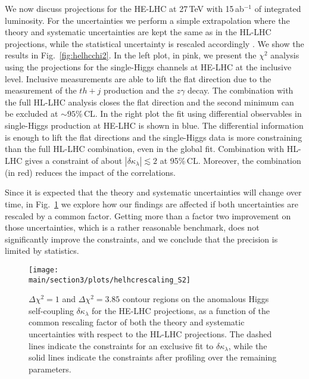 We now discuss projections for the HE-LHC at 27\,TeV with 15\,ab$^{-1}$ of integrated luminosity. For the uncertainties we perform a simple extrapolation where the theory and systematic uncertainties are kept the same as in the HL-LHC projections, while the statistical uncertainty is rescaled accordingly \cite{Goncalves:2018qas}. We show the results in Fig.~\ref{fig:helhcchi2}. In the left plot, in pink, we present the $\chi^2$ analysis using the projections for the single-Higgs channels at HE-LHC at the inclusive level. Inclusive measurements are able to lift the flat direction due to the measurement of the $th+j$ production and the $z\gamma$ decay. The combination with the full HL-LHC analysis closes the flat direction and the second minimum can be excluded at $\sim 95\%$\,CL. In the right plot the fit using differential observables in single-Higgs production at HE-LHC is shown in blue. The differential information is enough to lift the flat directions and the single-Higgs data is more constraining than the full HL-LHC combination, even in the global fit. Combination with HL-LHC gives a constraint of about $|\delta \kappa_\lambda |\lesssim  2$ at 95\%\,CL. Moreover, the combination (in red) reduces the impact of the correlations.
\medskip

Since it is expected that the theory and systematic uncertainties will change over time, in Fig.~\ref{fig:helhcrescaling} we explore how our findings are affected if both uncertainties are rescaled by a common factor. Getting more than a factor two improvement on those uncertainties, which is a rather reasonable benchmark, does not significantly improve the constraints, and we conclude that the precision is limited by statistics.	

\begin{figure}[h]
	\centering
	\texttt{[image: \\main/section3/plots/helhcrescaling\_S2]}
	\caption{$\Delta\chi^2=1$ and $\Delta\chi^2=3.85$ contour regions on the anomalous Higgs self-coupling $\delta \kappa_\lambda$ for the HE-LHC projections, as a function of the common rescaling factor of both the theory and systematic uncertainties with respect to the HL-LHC projections. The dashed lines indicate the constraints for an exclusive fit to $\delta\kappa_\lambda$, while the solid lines indicate the constraints after profiling over the remaining parameters.}
	\label{fig:helhcrescaling}
\end{figure}

